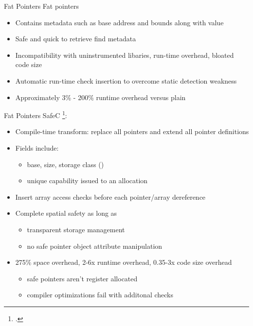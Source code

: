 \documentclass[aspectratio=169]{beamer}
\begin{document}
\begin{frame}[fragile]{Fat Pointers}
  \footnotesize
Fat pointers
\begin{itemize}[<+->]
 \item Contains metadata such as base address and bounds along with value
 \item Safe and quick to retrieve find metadata
 \item Incompatibility with uninstrumented libaries, run-time overhead, bloated code size
 \item Automatic run-time check insertion to overcome static detection weakness
 \item Approximately 3\% - 200\% runtime overhead versus plain
\end{itemize}
\end{frame}

\begin{frame}{Fat Pointers}
SafeC \footcite{austin_efficient_1994}:
  \begin{itemize}
     \item Compile-time transform: replace all pointers and extend all pointer definitions
     \item Fields include:
          \begin{itemize}
             \item base, size, storage class () %
             \item unique capability issued to an allocation %
          \end{itemize}
     \item Insert array access checks before each pointer/array dereference
     \item Complete spatial safety as long as
         \begin{itemize}
            \item transparent storage management %
            \item no safe pointer object attribute manipulation
         \end{itemize}
     \item 275\% space overhead, 2-6x runtime overhead, 0.35-3x code size overhead
         \begin{itemize}
            \item safe pointers aren't register allocated
            \item compiler optimizations fail with additonal checks
         \end{itemize}
  \end{itemize}
\vspace{0.2in}
\end{frame}
\end{document}
